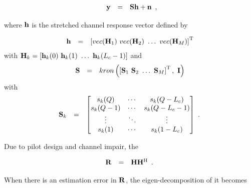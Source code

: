 \documentclass[a4paper,10pt,fleqn, twocolumn]{IEEEtran}
\newcommand{\bh}{{\bf h}}
\newcommand{\bH}{{\bf H}}
\newcommand{\bn}{{\bf n}}
\newcommand{\by}{{\bf y}}
\newcommand{\bS}{{\bf S}}
\newcommand{\bI}{{\bf I}}
\newcommand{\bR}{{\bf R}}
\begin{document}
\begin{equation}\hspace{-0.00in}
\begin{array}{rcl}
\by&=&\bS\bh+\bn
\end{array},
\end{equation}

\noindent where $\bh$ is the stretched channel response vector
defined by

\begin{equation}\hspace{-0.00in}
\begin{array}{rcl}
\bh&=&\left[\mbox{vec}(\bH_{1})\ \mbox{vec}(\bH_{2})\ \ldots\
\mbox{vec}(\bH_{M})\right]^{\rm T}
\end{array}
\end{equation}
\noindent with $\bH_{k}=\left[\bh_{k}(0)\ \bh_{k}(1)\ \ldots\
\bh_{k}(L_{c}-1)\right]$ and
\begin{equation}\hspace{-0.00in}
\begin{array}{rcl}
\bS&=&\mbox{kron}\left(\left[\bS_{1}\ \bS_{2}\ \ldots\
\bS_{M}\right]^{\rm T},\ \bI\right)
\end{array}
\end{equation}
\noindent with
\begin{equation}\hspace{-0.10in}
\begin{array}{rcl}
\bS_{k}&=&\left[\begin{matrix}
s_{k}(Q)&\cdots&s_{k}(Q-L_{c})\\
s_{k}(Q-1)&\cdots&s_{k}(Q-L_{c}-1)\\
\vdots&\ddots&\vdots\\
s_{k}(1)&\cdots&s_{k}(1-L_{c})
\end{matrix}\right]
\end{array}.
\end{equation}

Due to pilot design and channel impair,  the

\begin{equation}\hspace{-0.10in}
\begin{array}{rcl}
\bR&=&\bH\bH^{\rm H}
\end{array}.
\end{equation}

When there is an estimation error in $\bR$, the
eigen-decomposition of it becomes
\end{document}
